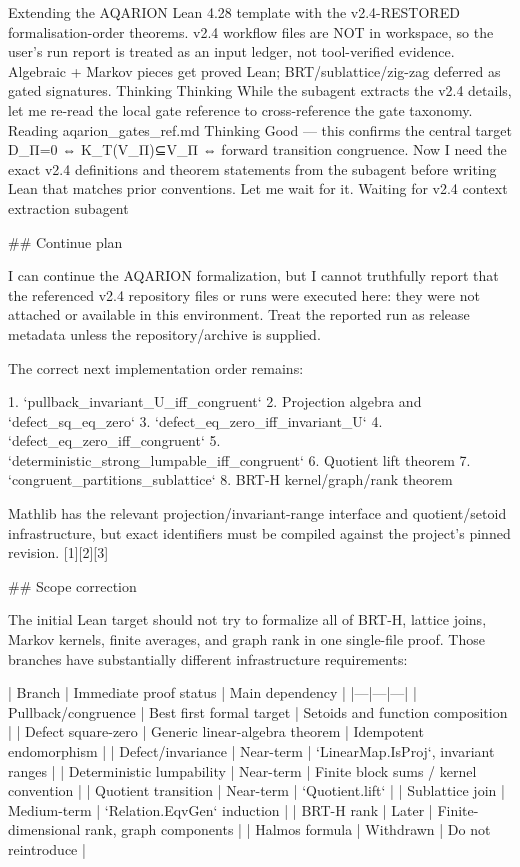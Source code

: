 Extending the AQARION Lean 4.28 template with the v2.4-RESTORED formalisation-order theorems. v2.4 workflow files are NOT in workspace, so the user's run report is treated as an input ledger, not tool-verified evidence. Algebraic + Markov pieces get proved Lean; BRT/sublattice/zig-zag deferred as gated signatures.
Thinking
Thinking
While the subagent extracts the v2.4 details, let me re-read the local gate reference to cross-reference the gate taxonomy.
Reading aqarion_gates_ref.md
Thinking
Good — this confirms the central target D_Π=0 ⇔ K_T(V_Π)⊆V_Π ⇔ forward transition congruence. Now I need the exact v2.4 definitions and theorem statements from the subagent before writing Lean that matches prior conventions. Let me wait for it.
Waiting for v2.4 context extraction subagent

## Continue plan

I can continue the AQARION formalization, but I cannot truthfully report that the referenced v2.4 repository files or runs were executed here: they were not attached or available in this environment. Treat the reported run as release metadata unless the repository/archive is supplied.

The correct next implementation order remains:

1. `pullback_invariant_U_iff_congruent`
2. Projection algebra and `defect_sq_eq_zero`
3. `defect_eq_zero_iff_invariant_U`
4. `defect_eq_zero_iff_congruent`
5. `deterministic_strong_lumpable_iff_congruent`
6. Quotient lift theorem
7. `congruent_partitions_sublattice`
8. BRT-H kernel/graph/rank theorem

Mathlib has the relevant projection/invariant-range interface and quotient/setoid infrastructure, but exact identifiers must be compiled against the project’s pinned revision. [1][2][3]

## Scope correction

The initial Lean target should not try to formalize all of BRT-H, lattice joins, Markov kernels, finite averages, and graph rank in one single-file proof. Those branches have substantially different infrastructure requirements:

| Branch | Immediate proof status | Main dependency |
|---|---|---|
| Pullback/congruence | Best first formal target | Setoids and function composition |
| Defect square-zero | Generic linear-algebra theorem | Idempotent endomorphism |
| Defect/invariance | Near-term | `LinearMap.IsProj`, invariant ranges |
| Deterministic lumpability | Near-term | Finite block sums / kernel convention |
| Quotient transition | Near-term | `Quotient.lift` |
| Sublattice join | Medium-term | `Relation.EqvGen` induction |
| BRT-H rank | Later | Finite-dimensional rank, graph components |
| Halmos formula | Withdrawn | Do not reintroduce |

